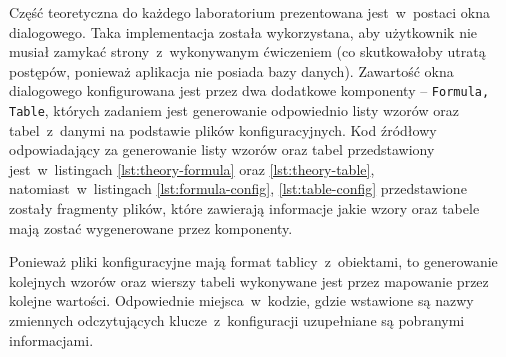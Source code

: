 Część teoretyczna do każdego laboratorium prezentowana jest~w~postaci okna dialogowego. Taka
implementacja została wykorzystana, aby użytkownik nie musiał zamykać strony~z~wykonywanym
ćwiczeniem (co skutkowałoby utratą postępów, ponieważ aplikacja nie posiada bazy danych). Zawartość
okna dialogowego konfigurowana jest przez dwa dodatkowe komponenty -- \texttt{Formula, Table},
których zadaniem jest generowanie odpowiednio listy wzorów oraz tabel~z~danymi na podstawie plików
konfiguracyjnych. Kod źródłowy odpowiadający za generowanie listy wzorów oraz tabel przedstawiony
jest~w~listingach \ref{lst:theory-formula} oraz \ref{lst:theory-table}, natomiast~w~listingach
\ref{lst:formula-config}, \ref{lst:table-config} przedstawione zostały fragmenty plików, które
zawierają informacje jakie wzory oraz tabele mają zostać wygenerowane przez komponenty.





Ponieważ pliki konfiguracyjne mają format tablicy~z~obiektami, to generowanie kolejnych wzorów oraz
wierszy tabeli wykonywane jest przez mapowanie przez kolejne wartości. Odpowiednie
miejsca~w~kodzie, gdzie wstawione są nazwy zmiennych odczytujących klucze~z~konfiguracji
uzupełniane są pobranymi informacjami.
